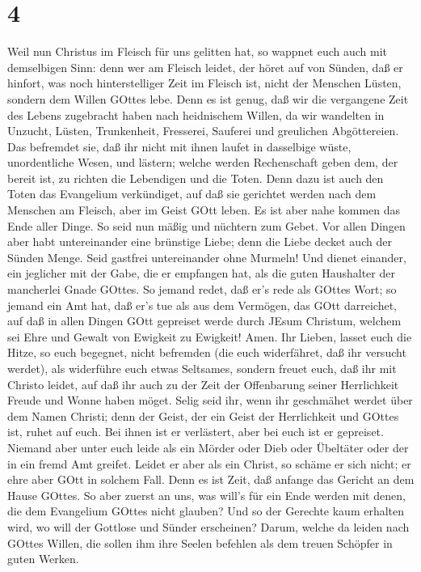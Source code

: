 \hypertarget{section-3}{%
\section{4}\label{section-3}}

 Weil nun Christus im Fleisch für uns gelitten hat, so
wappnet euch auch mit demselbigen Sinn: denn wer am Fleisch leidet, der
höret auf von Sünden,  daß er hinfort, was noch
hinterstelliger Zeit im Fleisch ist, nicht der Menschen Lüsten, sondern
dem Willen GOttes lebe.  Denn es ist genug, daß wir die
vergangene Zeit des Lebens zugebracht haben nach heidnischem Willen, da
wir wandelten in Unzucht, Lüsten, Trunkenheit, Fresserei, Sauferei und
greulichen Abgöttereien.  Das befremdet sie, daß ihr nicht
mit ihnen laufet in dasselbige wüste, unordentliche Wesen, und lästern;
 welche werden Rechenschaft geben dem, der bereit ist, zu
richten die Lebendigen und die Toten.  Denn dazu ist auch
den Toten das Evangelium verkündiget, auf daß sie gerichtet werden nach
dem Menschen am Fleisch, aber im Geist GOtt leben.  Es ist
aber nahe kommen das Ende aller Dinge.  So seid nun mäßig
und nüchtern zum Gebet. Vor allen Dingen aber habt untereinander eine
brünstige Liebe; denn die Liebe decket auch der Sünden Menge.
 Seid gastfrei untereinander ohne Murmeln!  Und
dienet einander, ein jeglicher mit der Gabe, die er empfangen hat, als
die guten Haushalter der mancherlei Gnade GOttes.  So
jemand redet, daß er's rede als GOttes Wort; so jemand ein Amt hat, daß
er's tue als aus dem Vermögen, das GOtt darreichet, auf daß in allen
Dingen GOtt gepreiset werde durch JEsum Christum, welchem sei Ehre und
Gewalt von Ewigkeit zu Ewigkeit! Amen.  Ihr Lieben, lasset
euch die Hitze, so euch begegnet, nicht befremden (die euch widerfähret,
daß ihr versucht werdet), als widerführe euch etwas Seltsames,
 sondern freuet euch, daß ihr mit Christo leidet, auf daß
ihr auch zu der Zeit der Offenbarung seiner Herrlichkeit Freude und
Wonne haben möget.  Selig seid ihr, wenn ihr geschmähet
werdet über dem Namen Christi; denn der Geist, der ein Geist der
Herrlichkeit und GOttes ist, ruhet auf euch. Bei ihnen ist er
verlästert, aber bei euch ist er gepreiset.  Niemand aber
unter euch leide als ein Mörder oder Dieb oder Übeltäter oder der in ein
fremd Amt greifet.  Leidet er aber als ein Christ, so
schäme er sich nicht; er ehre aber GOtt in solchem Fall. 
Denn es ist Zeit, daß anfange das Gericht an dem Hause GOttes. So aber
zuerst an uns, was will's für ein Ende werden mit denen, die dem
Evangelium GOttes nicht glauben?  Und so der Gerechte kaum
erhalten wird, wo will der Gottlose und Sünder erscheinen? 
Darum, welche da leiden nach GOttes Willen, die sollen ihm ihre Seelen
befehlen als dem treuen Schöpfer in guten Werken.


